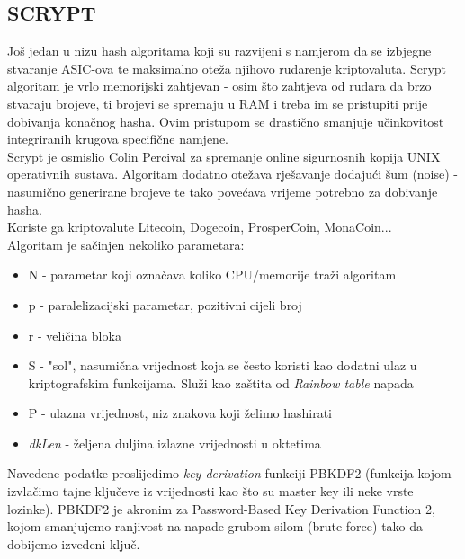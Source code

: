 \documentclass[12pt]{article}
\begin{document}
\subsection{SCRYPT}
Još jedan u nizu hash algoritama koji su razvijeni s namjerom  da se izbjegne stvaranje ASIC-ova te maksimalno oteža njihovo rudarenje kriptovaluta. Scrypt algoritam je vrlo memorijski zahtjevan - osim što zahtjeva od rudara da brzo stvaraju brojeve, ti brojevi se spremaju u RAM i treba im se pristupiti prije dobivanja konačnog hasha. Ovim pristupom se drastično smanjuje učinkovitost integriranih krugova specifične namjene.\\
Scrypt je osmislio Colin Percival za spremanje online sigurnosnih kopija UNIX operativnih sustava. Algoritam dodatno otežava rješavanje dodajući šum (noise) - nasumično generirane brojeve te tako povećava vrijeme potrebno za dobivanje hasha. \\
Koriste ga kriptovalute Litecoin, Dogecoin, ProsperCoin, MonaCoin...\\
Algoritam je sačinjen nekoliko parametara:
\begin{itemize}
	\item N - parametar koji označava koliko CPU/memorije traži algoritam
	\item p - paralelizacijski parametar, pozitivni cijeli broj
	\item r - veličina bloka
	\item S - "sol", nasumična vrijednost koja se često koristi kao dodatni ulaz u kriptografskim funkcijama. Služi kao zaštita od \textit{Rainbow table} napada
	\item P - ulazna vrijednost, niz znakova koji želimo hashirati
	\item \textit{dkLen} - željena duljina izlazne vrijednosti u oktetima
\end{itemize}
%
Navedene podatke proslijedimo \textit{key derivation} funkciji PBKDF2 (funkcija kojom izvlačimo tajne ključeve iz vrijednosti kao što su master key ili neke vrste lozinke). PBKDF2 je akronim za Password-Based Key Derivation Function 2, kojom smanjujemo ranjivost na napade grubom silom (brute force) tako da dobijemo izvedeni ključ.\cite{scrypt}

\pagebreak
\end{document}
